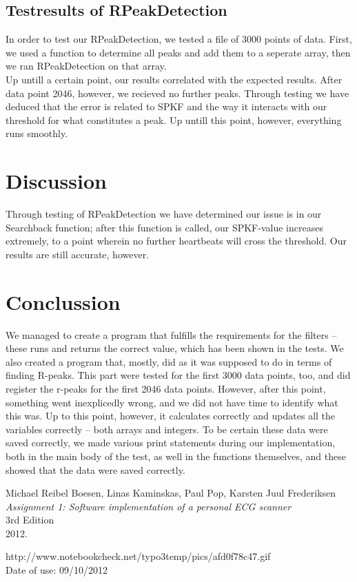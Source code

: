 \documentclass[12pt,a4paper]{article}
\begin{document}
\subsection{Testresults of RPeakDetection}
In order to test our RPeakDetection, we tested a file of 3000 points of data. First, we used a function to determine all peaks and add them to a seperate array, then we ran RPeakDetection on that array.\\
Up untill a certain point, our results correlated with the expected results. After data point 2046, however, we recieved no further peaks. Through testing we have deduced that the error is related to SPKF and the way it interacts with our threshold for what constitutes a peak. Up untill this point, however, everything runs smoothly. 

\section{Discussion}

Through testing of RPeakDetection we have determined our issue is in our Searchback function; after this function is called, our SPKF-value increases extremely, to a point wherein no further heartbeats will cross the threshold. Our results are still accurate, however. 


\section{Conclussion}
We managed to create a program that fulfills the requirements for the filters – these runs and returns the correct value, which has been shown in the tests.
We also created a program that, mostly, did as it was supposed to do in terms of finding R-peaks. This part were tested for the first 3000 data points, too, and did register the r-peaks for the first 2046 data points. However, after this point, something went inexplicedly wrong, and we did not have time to identify what this was. Up to this point, however, it calculates correctly and updates all the variables correctly – both arrays and integers. To be certain these data were saved correctly, we made various print statements during our implementation, both in the main body of the test, as well in the functions themselves, and these showed that the data were saved correctly.
\newpage
\begin{thebibliography}{9}

  Michael Reibel Boesen, Linas Kaminskas, Paul Pop, Karsten Juul Frederiksen\\
  \emph{Assignment 1: Software implementation of a personal ECG scanner}\\
  3rd Edition\\
  2012.

	http://www.notebookcheck.net/typo3temp/pics/afd0f78c47.gif\\
	Date of use: 09/10/2012
\end{thebibliography}
	
\end{document}
